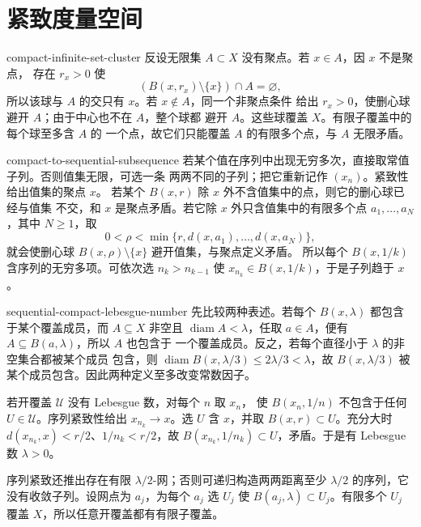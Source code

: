 \chapter{紧致度量空间}
\label{chap:compact-metric-spaces-solutions}

\begin{solution}{compact-infinite-set-cluster}
反设无限集 \(A\subset X\) 没有聚点。若 \(x\in A\)，因 \(x\) 不是聚点，
存在 \(r_x>0\) 使
\[
 (B(x,r_x)\setminus\{x\})\cap A=\varnothing,
\]
所以该球与 \(A\) 的交只有 \(x\)。若 \(x\notin A\)，同一个非聚点条件
给出 \(r_x>0\)，使删心球避开 \(A\)；由于中心也不在 \(A\)，整个球都
避开 \(A\)。这些球覆盖 \(X\)。有限子覆盖中的每个球至多含 \(A\) 的
一个点，故它们只能覆盖 \(A\) 的有限多个点，与 \(A\) 无限矛盾。
\end{solution}

\begin{solution}{compact-to-sequential-subsequence}
若某个值在序列中出现无穷多次，直接取常值子列。否则值集无限，可选一条
两两不同的子列；把它重新记作 \((x_n)\)。紧致性给出值集的聚点 \(x\)。
若某个 \(B(x,r)\) 除 \(x\) 外不含值集中的点，则它的删心球已经与值集
不交，和 \(x\) 是聚点矛盾。若它除 \(x\) 外只含值集中的有限多个点
\(a_1,\ldots,a_N\)，其中 \(N\ge1\)，取
\[
 0<\rho<\min\{r,d(x,a_1),\ldots,d(x,a_N)\},
\]
就会使删心球 \(B(x,\rho)\setminus\{x\}\) 避开值集，与聚点定义矛盾。
所以每个 \(B(x,1/k)\) 含序列的无穷多项。可依次选
\(n_k>n_{k-1}\) 使 \(x_{n_k}\in B(x,1/k)\)，于是子列趋于 \(x\)。
\end{solution}

\begin{solution}{sequential-compact-lebesgue-number}
先比较两种表述。若每个 \(B(x,\lambda)\) 都包含于某个覆盖成员，而
\(A\subseteq X\) 非空且 \(\operatorname{diam}A<\lambda\)，任取
\(a\in A\)，便有 \(A\subseteq B(a,\lambda)\)，所以 \(A\) 也包含于
一个覆盖成员。反之，若每个直径小于 \(\lambda\) 的非空集合都被某个成员
包含，则
\(\operatorname{diam}B(x,\lambda/3)\le2\lambda/3<\lambda\)，故
\(B(x,\lambda/3)\) 被某个成员包含。因此两种定义至多改变常数因子。

若开覆盖 \(\mathcal U\) 没有 Lebesgue 数，对每个 \(n\) 取 \(x_n\)，
使 \(B(x_n,1/n)\) 不包含于任何 \(U\in\mathcal U\)。序列紧致性给出
\(x_{n_k}\to x\)。选 \(U\) 含 \(x\)，并取
\(B(x,r)\subset U\)。充分大时
\(d(x_{n_k},x)<r/2\)、\(1/n_k<r/2\)，故
\(B(x_{n_k},1/n_k)\subset U\)，矛盾。于是有 Lebesgue 数
\(\lambda>0\)。

序列紧致还推出存在有限 \(\lambda/2\)-网；否则可递归构造两两距离至少
\(\lambda/2\) 的序列，它没有收敛子列。设网点为 \(a_j\)，为每个 \(a_j\)
选 \(U_j\) 使 \(B(a_j,\lambda)\subset U_j\)。有限多个 \(U_j\) 覆盖
\(X\)，所以任意开覆盖都有有限子覆盖。
\end{solution}

